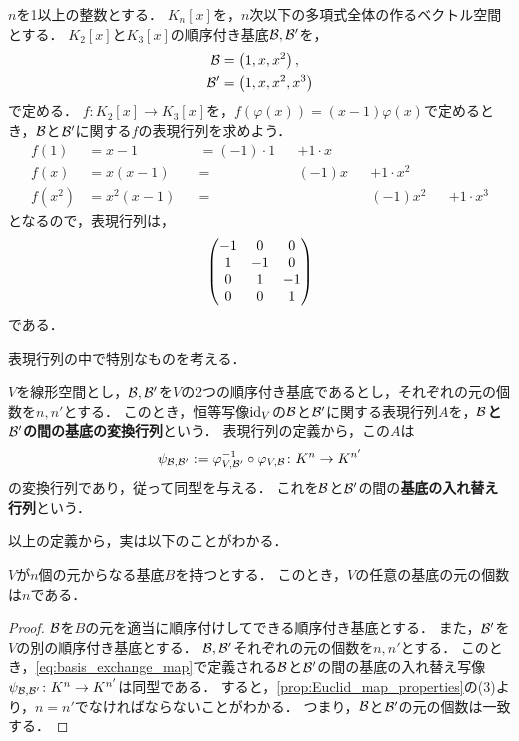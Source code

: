 \begin{example}
    $n$を1以上の整数とする．
    $K_n[x]$を，$n$次以下の多項式全体の作るベクトル空間とする．
    $K_2[x]$と$K_3[x]$の順序付き基底$\mathcal{B},\mathcal{B}'$を，
    \[
        \begin{aligned}
            \mathcal{B} &= \left(1, x, x^2\right), \\
            \mathcal{B}' &= \left(1, x, x^2, x^3 \right)
        \end{aligned}
    \]
    で定める．
    $f \colon K_2[x] \to K_3[x]$を，$f(\varphi(x)) = (x-1)\varphi(x)$で定めるとき，$\mathcal{B}$と$\mathcal{B}'$に関する$f$の表現行列を求めよう．
    \[
        \begin{aligned}
            f(1) &= x - 1 & &= (-1) \cdot 1 & &+ 1 \cdot x & & & & \\
            f(x) &= x(x-1) & &= & & (-1)x & & +1 \cdot x^2 & & \\
            f(x^2) &= x^2(x-1) & &= & & & & (-1)x^2 & & +1 \cdot x^3
        \end{aligned}
    \]
    となるので，表現行列は，
    \[
        \begin{pmatrix} -1 & 0 & 0 \\ 1 & -1 & 0 \\ 0 & 1 & -1 \\ 0 & 0 & 1 \end{pmatrix}
    \]
    である．
\end{example}
表現行列の中で特別なものを考える．
\begin{dfn}
    $V$を線形空間とし，$\mathcal{B},\mathcal{B}'$を$V$の2つの順序付き基底であるとし，それぞれの元の個数を$n,n'$とする．
    このとき，恒等写像$\mathrm{id}_V$の$\mathcal{B}$と$\mathcal{B}'$に関する表現行列$A$を，\textbf{$\mathcal{B}$と$\mathcal{B}'$の間の基底の変換行列}という．
    表現行列の定義から，この$A$は
    \begin{equation}\label{eq:basis_exchange_map}
        \psi_{\mathcal{B},\mathcal{B}'} := \varphi_{V,\mathcal{B}'}^{-1} \circ \varphi_{V,\mathcal{B}} \colon K^n \to K^{n'}
    \end{equation}
    の変換行列であり，従って同型を与える．
    これを$\mathcal{B}$と$\mathcal{B}'$の間の\textbf{基底の入れ替え行列}という．
\end{dfn}
以上の定義から，実は以下のことがわかる．
\begin{thm}\label{thm:dim_well-posedness}
    $V$が$n$個の元からなる基底$B$を持つとする．
    このとき，$V$の任意の基底の元の個数は$n$である．
\end{thm}
\begin{proof}
    $\mathcal{B}$を$B$の元を適当に順序付けしてできる順序付き基底とする．
    また，$\mathcal{B}'$を$V$の別の順序付き基底とする．
    $\mathcal{B},\mathcal{B}'$それぞれの元の個数を$n,n'$とする．
    このとき，\eqref{eq:basis_exchange_map}で定義される$\mathcal{B}$と$\mathcal{B}'$の間の基底の入れ替え写像$\psi_{\mathcal{B},\mathcal{B}'}\colon K^n \to K^{n'}$は同型である．
    すると，\cref{prop:Euclid_map_properties}の(3)より，$n=n'$でなければならないことがわかる．
    つまり，$\mathcal{B}$と$\mathcal{B}'$の元の個数は一致する．
\end{proof}